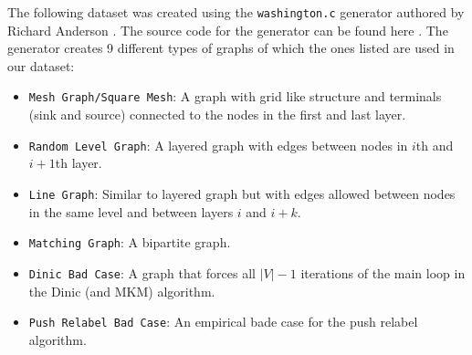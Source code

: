 The following dataset was created using the \texttt{washington.c} generator authored by Richard Anderson \cite{washington}. The source code for the generator can be found here \cite{washingtonc}. The generator creates 9 different types of graphs of which the ones listed are used in our dataset:
\begin{itemize}
\item \texttt{Mesh Graph/Square Mesh}: A graph with grid like structure and terminals (sink and source) connected to the nodes in the first and last layer.
\item \texttt{Random Level Graph}: A layered graph with edges between nodes in $i$th and $i+1$th layer.
\item \texttt{Line Graph}: Similar to layered graph but with edges allowed between nodes in the same level and between layers $i$ and $i+k$.
\item \texttt{Matching Graph}: A bipartite graph.
\item \texttt{Dinic Bad Case}: A graph that forces all $|V|-1$ iterations of the main loop in the Dinic (and MKM) algorithm.
\item \texttt{Push Relabel Bad Case}: An empirical bade case for the push relabel algorithm.
\end{itemize}

